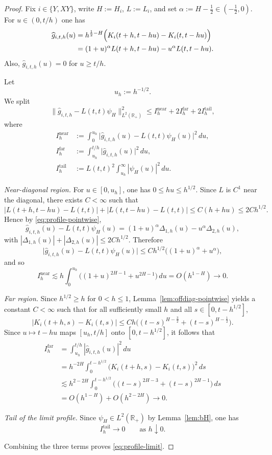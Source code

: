 \documentclass[11pt,a4paper]{amsart}
\theoremstyle{plain}
\theoremstyle{definition}
\theoremstyle{remark}
\newcommand{\R}{\mathbb{R}}
\begin{document}
\begin{proof}
Fix $i\in\{Y,XY\}$, write $H:=H_i$, $L:=L_i$, and set $\alpha:=H-\tfrac12\in(-\tfrac12,0)$.
For $u\in(0,t/h)$ one has
\begin{align}
\widehat g_{i,t,h}(u)
&=
h^{\frac12-H}\Bigl(K_i(t+h,t-hu)-K_i(t,t-hu)\Bigr) \notag\\
&=
(1+u)^\alpha L(t+h,t-hu)-u^\alpha L(t,t-hu). \label{eq:profile-pointwise}
\end{align}
Also, $\widehat g_{i,t,h}(u)=0$ for $u\ge t/h$.

Let
\[
u_h:=h^{-1/2}.
\]
We split
\[
\|\widehat g_{i,t,h}-L(t,t)\psi_H\|_{L^2(\R_+)}^2
\le
I_h^{\mathrm{near}}+2I_h^{\mathrm{far}}+2I_h^{\mathrm{tail}},
\]
where
\begin{align*}
I_h^{\mathrm{near}}
&:=
\int_0^{u_h}
\bigl|\widehat g_{i,t,h}(u)-L(t,t)\psi_H(u)\bigr|^2\,du,\\
I_h^{\mathrm{far}}
&:=
\int_{u_h}^{t/h}\bigl|\widehat g_{i,t,h}(u)\bigr|^2\,du,\\
I_h^{\mathrm{tail}}
&:=
L(t,t)^2\int_{u_h}^\infty |\psi_H(u)|^2\,du.
\end{align*}

\emph{Near-diagonal region.}
For $u\in[0,u_h]$, one has $0\le hu\le h^{1/2}$. Since $L$ is $C^1$ near the diagonal,
there exists $C<\infty$ such that
\[
|L(t+h,t-hu)-L(t,t)|+|L(t,t-hu)-L(t,t)|\le C(h+hu)\le 2Ch^{1/2}.
\]
Hence by \eqref{eq:profile-pointwise},
\[
\widehat g_{i,t,h}(u)-L(t,t)\psi_H(u)
=
(1+u)^\alpha \Delta_{1,h}(u)-u^\alpha \Delta_{2,h}(u),
\]
with $|\Delta_{1,h}(u)|+|\Delta_{2,h}(u)|\le 2Ch^{1/2}$. Therefore
\[
\bigl|\widehat g_{i,t,h}(u)-L(t,t)\psi_H(u)\bigr|
\le
Ch^{1/2}\bigl((1+u)^\alpha+u^\alpha\bigr),
\]
and so
\[
I_h^{\mathrm{near}}
\lesssim
h\int_0^{u_h}\bigl((1+u)^{2H-1}+u^{2H-1}\bigr)\,du
=
O(h^{1-H})
\longrightarrow 0.
\]

\emph{Far region.}
Since $h^{1/2}\ge h$ for $0<h\le1$, Lemma~\ref{lem:offdiag-pointwise} yields a constant
$C<\infty$ such that for all sufficiently small $h$ and all $s\in[0,t-h^{1/2}]$,
\[
|K_i(t+h,s)-K_i(t,s)|
\le
Ch\bigl((t-s)^{H-\frac32}+(t-s)^{H-\frac12}\bigr).
\]
Since $u\mapsto t-hu$ maps $[u_h,t/h]$ onto $[0,t-h^{1/2}]$, it follows that
\begin{align*}
I_h^{\mathrm{far}}
&=
\int_{u_h}^{t/h}|\widehat g_{i,t,h}(u)|^2\,du \\
&=
h^{-2H}\int_0^{t-h^{1/2}} \bigl(K_i(t+h,s)-K_i(t,s)\bigr)^2\,ds \\
&\lesssim
h^{2-2H}\int_0^{t-h^{1/2}}
\bigl((t-s)^{2H-3}+(t-s)^{2H-1}\bigr)\,ds \\
&=
O(h^{1-H})+O(h^{2-2H})
\longrightarrow 0.
\end{align*}

\emph{Tail of the limit profile.}
Since $\psi_H\in L^2(\R_+)$ by Lemma~\ref{lem:bH}, one has
\[
I_h^{\mathrm{tail}}\longrightarrow 0
\qquad\text{as }h\downarrow0.
\]

Combining the three terms proves \eqref{eq:profile-limit}.
\end{proof}
\end{document}
